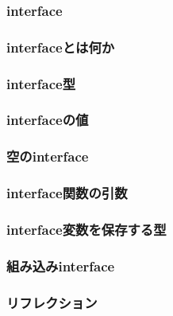 \subsubsection{interface}

\subsubsection{interfaceとは何か}

\subsubsection{interface型}

\subsubsection{interfaceの値}

\subsubsection{空のinterface}

\subsubsection{interface関数の引数}

\subsubsection{interface変数を保存する型}

\subsubsection{組み込みinterface}

\subsubsection{リフレクション}

